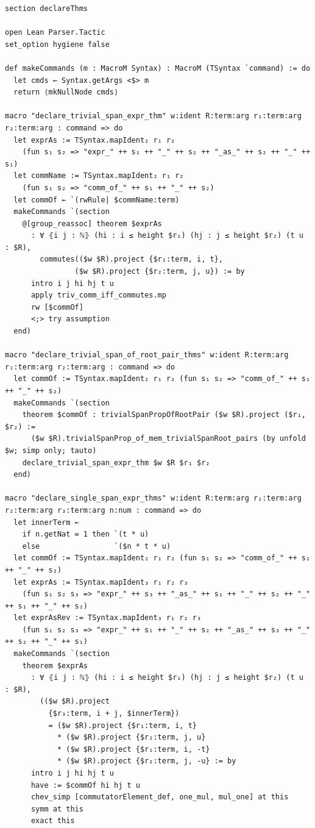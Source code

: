\documentclass[10pt,a4paper]{article}
\begin{document}
\begin{Verbatim}
section declareThms

open Lean Parser.Tactic
set_option hygiene false

def makeCommands (m : MacroM Syntax) : MacroM (TSyntax `command) := do
  let cmds ← Syntax.getArgs <$> m
  return ⟨mkNullNode cmds⟩

macro "declare_trivial_span_expr_thm" w:ident R:term:arg r₁:term:arg r₂:term:arg : command => do
  let exprAs := TSyntax.mapIdent₂ r₁ r₂
    (fun s₁ s₂ => "expr_" ++ s₁ ++ "_" ++ s₂ ++ "_as_" ++ s₂ ++ "_" ++ s₁)
  let commName := TSyntax.mapIdent₂ r₁ r₂
    (fun s₁ s₂ => "comm_of_" ++ s₁ ++ "_" ++ s₂)
  let commOf ← `(rwRule| $commName:term)
  makeCommands `(section
    @[group_reassoc] theorem $exprAs
      : ∀ ⦃i j : ℕ⦄ (hi : i ≤ height $r₁) (hj : j ≤ height $r₂) (t u : $R),
        commutes(($w $R).project {$r₁:term, i, t},
                ($w $R).project {$r₂:term, j, u}) := by
      intro i j hi hj t u
      apply triv_comm_iff_commutes.mp
      rw [$commOf]
      <;> try assumption
  end)

macro "declare_trivial_span_of_root_pair_thms" w:ident R:term:arg r₁:term:arg r₂:term:arg : command => do
  let commOf := TSyntax.mapIdent₂ r₁ r₂ (fun s₁ s₂ => "comm_of_" ++ s₁ ++ "_" ++ s₂)
  makeCommands `(section
    theorem $commOf : trivialSpanPropOfRootPair ($w $R).project ($r₁, $r₂) :=
      ($w $R).trivialSpanProp_of_mem_trivialSpanRoot_pairs (by unfold $w; simp only; tauto)
    declare_trivial_span_expr_thm $w $R $r₁ $r₂
  end)

macro "declare_single_span_expr_thms" w:ident R:term:arg r₁:term:arg r₂:term:arg r₃:term:arg n:num : command => do
  let innerTerm ←
    if n.getNat = 1 then `(t * u)
    else                 `($n * t * u)
  let commOf := TSyntax.mapIdent₂ r₁ r₂ (fun s₁ s₂ => "comm_of_" ++ s₁ ++ "_" ++ s₂)
  let exprAs := TSyntax.mapIdent₃ r₁ r₂ r₃
    (fun s₁ s₂ s₃ => "expr_" ++ s₃ ++ "_as_" ++ s₁ ++ "_" ++ s₂ ++ "_" ++ s₁ ++ "_" ++ s₂)
  let exprAsRev := TSyntax.mapIdent₃ r₁ r₂ r₃
    (fun s₁ s₂ s₃ => "expr_" ++ s₁ ++ "_" ++ s₂ ++ "_as_" ++ s₃ ++ "_" ++ s₂ ++ "_" ++ s₁)
  makeCommands `(section
    theorem $exprAs
      : ∀ ⦃i j : ℕ⦄ (hi : i ≤ height $r₁) (hj : j ≤ height $r₂) (t u : $R),
        (($w $R).project
          {$r₃:term, i + j, $innerTerm})
          = ($w $R).project {$r₁:term, i, t}
            * ($w $R).project {$r₂:term, j, u}
            * ($w $R).project {$r₁:term, i, -t}
            * ($w $R).project {$r₂:term, j, -u} := by
      intro i j hi hj t u
      have := $commOf hi hj t u
      chev_simp [commutatorElement_def, one_mul, mul_one] at this
      symm at this
      exact this


\end{Verbatim}
\end{document}
